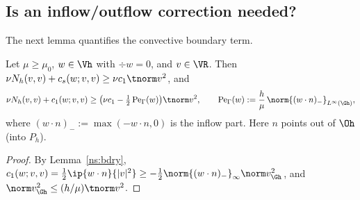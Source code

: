 \subsection{Is an inflow/outflow correction needed?}\label{ns:inflow}

The next lemma quantifies the convective boundary term.

\begin{lemma}\label{ns:pe}
Let $\mu\ge\mu_0$, $w\in\Vh$ with $\div w=0$, and $v\in\VR$. Then $\nu N_h(v,v)+c_s(w;v,v)\ge\nu c_1\tnorm v^2$, and
\[
\nu N_h(v,v)+c_1(w;v,v)\ge\bigl(\nu c_1-\tfrac12\,\mathrm{Pe}_\Gamma(w)\bigr)\tnorm v^2,\qquad
\mathrm{Pe}_\Gamma(w):=\frac{h}{\mu}\,\norm{(w\cdot n)_-}_{L^\infty(\Gh)},
\]
where $(w\cdot n)_-:=\max(-w\cdot n,0)$ is the inflow part. Here $n$ points out of $\Oh$ (into $P_h$).
\end{lemma}

\begin{proof}
By Lemma~\ref{ns:bdry}, $c_1(w;v,v)=\frac12\ip{w\cdot n}{|v|^2}\ge-\frac12\norm{(w\cdot n)_-}_\infty\norm v^2_{\Gh}$, and $\norm v^2_{\Gh}\le(h/\mu)\tnorm v^2$.
\end{proof}

